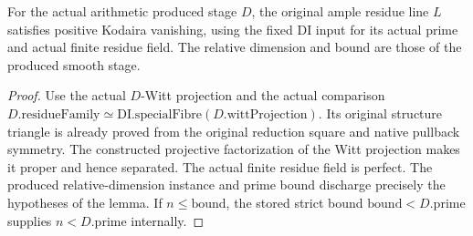 \begin{corollary}\label{cor:kn-actual-witt-stage-kodaira}
\leanok
{}
For the actual arithmetic produced stage $D$, the original ample residue
line $L$ satisfies positive Kodaira vanishing, using the fixed DI input for
its actual prime and actual finite residue field. The relative dimension
and bound are those of the produced smooth stage.
\end{corollary}
\begin{proof}
Use the actual $D$-Witt projection and the actual comparison
$D.\mathrm{residueFamily}\simeq\mathrm{DI.specialFibre}(D.\mathrm{wittProjection})$.
Its original structure triangle is already proved from the original
reduction square and native pullback symmetry. The constructed projective
factorization of the Witt projection makes it proper and hence separated.
The actual finite residue field is perfect. The produced relative-dimension
instance and prime bound discharge precisely the hypotheses of the lemma.
If $n\leq\mathrm{bound}$, the stored strict bound
$\mathrm{bound}<D.\mathrm{prime}$ supplies $n<D.\mathrm{prime}$ internally.
\end{proof}
